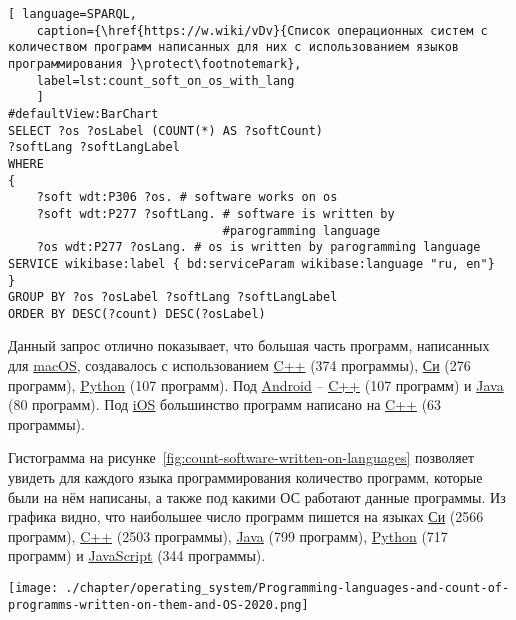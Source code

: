 \begin{lstlisting}[ language=SPARQL, 
	caption={\href{https://w.wiki/vDv}{Список операционных систем с количеством программ написанных для них с использованием языков программирования }\protect\footnotemark},
	label=lst:count_soft_on_os_with_lang
	]
#defaultView:BarChart
SELECT ?os ?osLabel (COUNT(*) AS ?softCount)
?softLang ?softLangLabel
WHERE
{
	?soft wdt:P306 ?os. # software works on os
	?soft wdt:P277 ?softLang. # software is written by 
	                          #parogramming language
	?os wdt:P277 ?osLang. # os is written by parogramming language
SERVICE wikibase:label { bd:serviceParam wikibase:language "ru, en"}
}
GROUP BY ?os ?osLabel ?softLang ?softLangLabel
ORDER BY DESC(?count) DESC(?osLabel)
\end{lstlisting}

Данный запрос отлично показывает, что большая часть программ, написанных для \href{https://www.wikidata.org/wiki/Q14116}{macOS}, создавалось с использованием \href{https://www.wikidata.org/wiki/Q2407}{C++} (374 программы), \href{https://www.wikidata.org/wiki/Q15777}{Си} (276 программ), \href{https://www.wikidata.org/wiki/Q28865}{Python} (107 программ).
Под \href{https://www.wikidata.org/wiki/Q94}{Android} -- \href{https://www.wikidata.org/wiki/Q2407}{C++} (107 программ) и \href{https://www.wikidata.org/wiki/Q251}{Java} (80 программ).
Под \href{https://www.wikidata.org/wiki/Q48493}{iOS} большинство программ написано на \href{https://www.wikidata.org/wiki/Q2407}{C++} (63 программы).

Гистограмма на рисунке~\ref{fig:count-software-written-on-languages} позволяет увидеть для каждого языка программирования количество программ, которые были на нём написаны, а также под какими ОС работают данные программы. Из графика видно, что наибольшее число программ пишется на языках \href{https://www.wikidata.org/wiki/Q15777}{Си} (2566 программ), \href{https://www.wikidata.org/wiki/Q2407}{C++} (2503 программы), \href{https://www.wikidata.org/wiki/Q251}{Java} (799 программ), \href{https://www.wikidata.org/wiki/Q28865}{Python} (717 программ) и \href{https://www.wikidata.org/wiki/Q2005}{JavaScript} (344 программы).

\begin{figure*}[h!]
	\texttt{[image: ./chapter/operating\_system/Programming-languages-and-count-of-programms-written-on-them-and-OS-2020.png]}
	\caption{Языки программирования и количество ОС, под которыми работают программы, написанные на этих языках, 2020 год.}
	\label{fig:count-software-written-on-languages}
\end{figure*}

